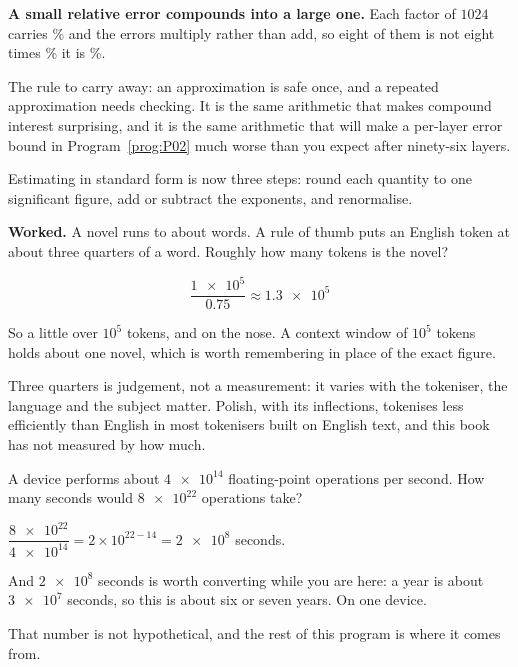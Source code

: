 \begin{fr}
\begin{trapbox}
\textbf{A small relative error compounds into a large one.} Each factor of
$1024$ carries \% and the errors multiply rather than
add, so eight of them is not eight times \% \dash{}
it is \%.

The rule to carry away: an approximation is safe once, and a repeated
approximation needs checking. It is the same arithmetic that makes compound
interest surprising, and it is the same arithmetic that will make a per-layer
error bound in Program~\ref{prog:P02} much worse than you expect after
ninety-six layers.
\end{trapbox}

Estimating in standard form is now three steps: round each quantity to one
significant figure, add or subtract the exponents, and renormalise.
\end{fr}

\begin{fr}
\textbf{Worked.} A novel runs to about  words. A rule of
thumb puts an English token at about three quarters of a word. Roughly how
many tokens is the novel?

\[ \frac{\num{1e5}}{\num{0.75}} \approx \num{1.3e5} \]

So a little over $10^{5}$ tokens, and  on the nose. A
context window of $10^{5}$ tokens holds about one novel, which is worth
remembering in place of the exact figure.

\begin{note}
Three quarters is judgement, not a measurement: it varies with the tokeniser,
the language and the subject matter. Polish, with its inflections, tokenises
less efficiently than English in most tokenisers built on English text, and
this book has not measured by how much.
\end{note}

\yourturn
A device performs about $\num{4e14}$ floating-point operations per second. How
many seconds would $\num{8e22}$ operations take?
\dotline
\nextframe
\end{fr}

\begin{fr}
\begin{ansblock}
$\dfrac{\num{8e22}}{\num{4e14}} = 2 \times 10^{22-14} = \num{2e8}$ seconds.

And $\num{2e8}$ seconds is worth converting while you are here: a year is about
$\num{3e7}$ seconds, so this is about six or seven years. On one device.
\end{ansblock}

That number is not hypothetical, and the rest of this program is where it comes
from.
\end{fr}

